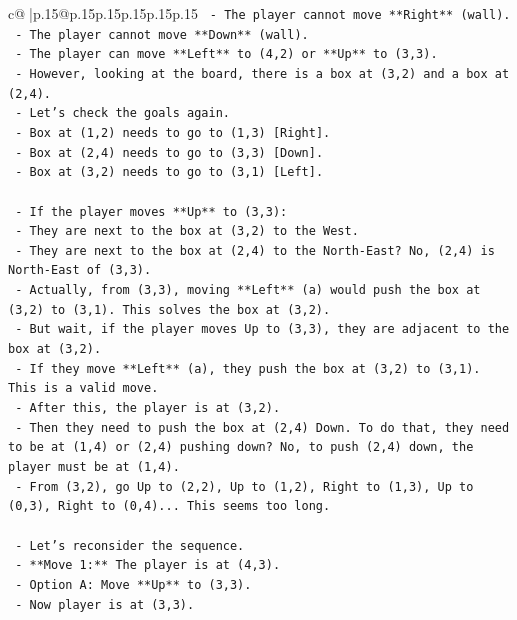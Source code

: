\documentclass{article}
\begin{document}
{\begin{supertabular}{c@{$\;$}|p{.15\linewidth}@{}p{.15\linewidth}p{.15\linewidth}p{.15\linewidth}p{.15\linewidth}p{.15\linewidth}}
{{{\texttt{    {-} The player cannot move **Right** (wall).} \\
\texttt{    {-} The player cannot move **Down** (wall).} \\
\texttt{    {-} The player can move **Left** to (4,2) or **Up** to (3,3).} \\
\texttt{    {-} However, looking at the board, there is a box at (3,2) and a box at (2,4).} \\
\texttt{    {-} Let's check the goals again.} \\
\texttt{        {-} Box at (1,2) needs to go to (1,3) {[}Right{]}.} \\
\texttt{        {-} Box at (2,4) needs to go to (3,3) {[}Down{]}.} \\
\texttt{        {-} Box at (3,2) needs to go to (3,1) {[}Left{]}.} \\
\\ 
\texttt{    {-} If the player moves **Up** to (3,3):} \\
\texttt{        {-} They are next to the box at (3,2) to the West.} \\
\texttt{        {-} They are next to the box at (2,4) to the North{-}East? No, (2,4) is North{-}East of (3,3).} \\
\texttt{        {-} Actually, from (3,3), moving **Left** (a) would push the box at (3,2) to (3,1). This solves the box at (3,2).} \\
\texttt{        {-} But wait, if the player moves Up to (3,3), they are adjacent to the box at (3,2).} \\
\texttt{        {-} If they move **Left** (a), they push the box at (3,2) to (3,1). This is a valid move.} \\
\texttt{        {-} After this, the player is at (3,2).} \\
\texttt{        {-} Then they need to push the box at (2,4) Down. To do that, they need to be at (1,4) or (2,4) pushing down? No, to push (2,4) down, the player must be at (1,4).} \\
\texttt{        {-} From (3,2), go Up to (2,2), Up to (1,2), Right to (1,3), Up to (0,3), Right to (0,4)... This seems too long.} \\
\\ 
\texttt{    {-} Let's reconsider the sequence.} \\
\texttt{    {-} **Move 1:** The player is at (4,3).} \\
\texttt{        {-} Option A: Move **Up** to (3,3).} \\
\texttt{            {-} Now player is at (3,3).} \\
}}}
\end{supertabular}}
\end{document}
